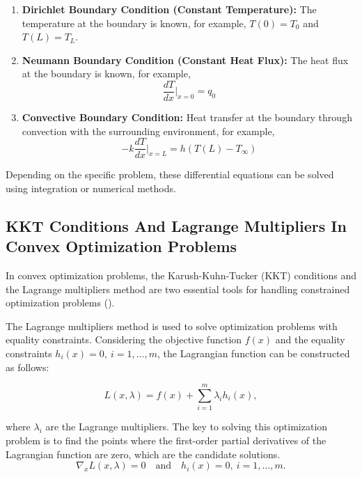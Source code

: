 \documentclass{article}
\begin{document}
\begin{enumerate}
    \item \textbf{Dirichlet Boundary Condition (Constant Temperature):} The temperature at the boundary is known, for example, \( T(0) = T_0 \) and \( T(L) = T_L \).
    \item \textbf{Neumann Boundary Condition (Constant Heat Flux):} The heat flux at the boundary is known, for example,
    \[
    \frac{dT}{dx} \bigg|_{x=0} = q_0
    \]
    \item \textbf{Convective Boundary Condition:} Heat transfer at the boundary through convection with the surrounding environment, for example,
    \[
    -k \frac{dT}{dx} \bigg|_{x=L} = h(T(L) - T_\infty)
    \]
\end{enumerate}

Depending on the specific problem, these differential equations can be solved using integration or numerical methods.

\subsection{KKT Conditions And Lagrange Multipliers In Convex Optimization Problems}

In convex optimization problems, the Karush-Kuhn-Tucker (KKT) conditions and the Lagrange multipliers method are two essential tools for handling constrained optimization problems (\textcite{convex}). 

The Lagrange multipliers method is used to solve optimization problems with equality constraints. Considering the objective function \(f(x)\) and the equality constraints \(h_i(x) = 0, \ i = 1, \ldots, m\), the Lagrangian function can be constructed as follows:

\[
L(x, \lambda) = f(x) + \sum_{i=1}^{m} \lambda_i h_i(x),
\]

where \(\lambda_i\) are the Lagrange multipliers. The key to solving this optimization problem is to find the points where the first-order partial derivatives of the Lagrangian function are zero, which are the candidate solutions.
    \[
    \nabla_x L(x, \lambda) = 0 \quad \text{and} \quad h_i(x) = 0, \ i = 1, \ldots, m.
    \]
\end{document}

